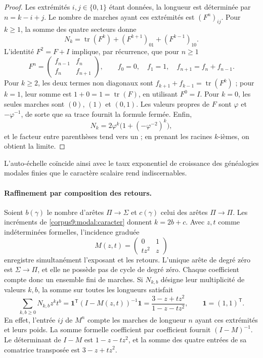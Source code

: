 \begin{proof}
Les extrémités \(i,j\in\{0,1\}\) étant données, la longueur est déterminée par \(n=k-i+j\). Le nombre de marches ayant ces extrémités est \((F^n)_{ij}\). Pour \(k\geq1\), la somme des quatre secteurs donne
\[
 N_k=\operatorname{tr}(F^k)
      +(F^{k+1})_{01}+(F^{k-1})_{10}.
\]
L'identité \(F^2=F+I\) implique, par récurrence, que pour \(n\geq1\)
\[
 F^n=\begin{pmatrix}f_{n-1}&f_n\\f_n&f_{n+1}\end{pmatrix},
 \qquad f_0=0,\quad f_1=1,\quad f_{n+1}=f_n+f_{n-1}.
\]
Pour \(k\geq2\), les deux termes non diagonaux sont
\(f_{k+1}+f_{k-1}=\operatorname{tr}(F^k)\) ; pour \(k=1\),
leur somme est \(1+0=1=\operatorname{tr}(F)\), en utilisant \(F^0=I\).
Pour \(k=0\), les seules marches sont \((0)\), \((1)\) et \((0,1)\).
Les valeurs propres de \(F\) sont \(\varphi\) et \(-\varphi^{-1}\),
de sorte que sa trace fournit la formule fermée.
Enfin,
\[
 N_k=2\varphi^k\bigl(1+(-\varphi^{-2})^k\bigr),
\]
et le facteur entre parenthèses tend vers un ; en prenant les racines
\(k\)-ièmes, on obtient la limite.
\end{proof}

L'auto-échelle coïncide ainsi avec le taux exponentiel de croissance
des généalogies modales finies que le caractère scalaire
rend indiscernables.

\paragraph{Raffinement par composition des retours.}
Soient \(b(\gamma)\) le nombre d'arêtes \(\Pi\to\Sigma\) et \(c(\gamma)\) celui des arêtes \(\Pi\to\Pi\). Les incréments de \eqref{corpus9:modal:caracter} donnent \(k=2b+c\). Avec \(z,t\) comme indéterminées formelles, l'incidence graduée
\[
 M(z,t)=\begin{pmatrix}0&1\\tz^2&z\end{pmatrix}
\]
enregistre simultanément l'exposant et les retours. L'unique arête
de degré zéro est \(\Sigma\to\Pi\), et elle ne possède pas de cycle de degré zéro.
Chaque coefficient compte donc un ensemble fini de marches.
Si \(N_{k,b}\) désigne leur multiplicité de valeurs \(k,b\), la somme
sur toutes les longueurs satisfait
\begin{equation}
 \sum_{k,b\geq0}N_{k,b}z^kt^b
 =\mathbf1^{\mathsf T}(I-M(z,t))^{-1}\mathbf1
 =\frac{3-z+tz^2}{1-z-tz^2},
 \qquad \mathbf1=(1,1)^{\mathsf T}.
 \label{corpus9:modal:serie-graduada}
\end{equation}
En effet, l'entrée \(ij\) de \(M^n\) compte les marches de
longueur \(n\) ayant ces extrémités et leurs poids. La somme formelle
coefficient par coefficient fournit \((I-M)^{-1}\).
Le déterminant de \(I-M\) est \(1-z-tz^2\), et la somme des
quatre entrées de sa comatrice transposée est \(3-z+tz^2\).

